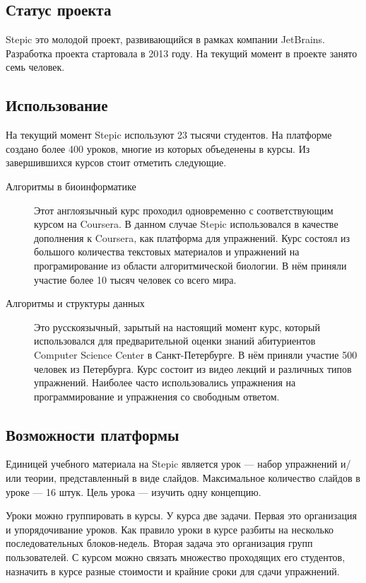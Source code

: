 \documentclass{matmex-diploma-custom}
\begin{document}
\subsection{Статус проекта}
Stepic \cite{stepic} это молодой проект, развивающийся в рамках компании
JetBrains. Разработка проекта стартовала в 2013 году. На текущий
момент в проекте занято семь человек.

\subsection{Использование}
На текущий момент Stepic используют 23 тысячи студентов. На платформе
создано более 400 уроков, многие из которых объеденены в курсы. Из
завершившихся курсов стоит отметить следующие.

\begin{description}
\item[Алгоритмы в биоинформатике] Этот англоязычный курс проходил
  одновременно с соответствующим курсом на Coursera. В данном случае
  Stepic использовался в качестве дополнения к Coursera, как платформа
  для упражнений. Курс состоял из большого количества текстовых
  материалов и упражнений на програмирование из области
  алгоритмической биологии. В нём приняли участие более 10 тысяч
  человек со всего мира.

\item[Алгоритмы и структуры данных] Это русскоязычный, зарытый на
  настоящий момент курс, который использовался для предварительной
  оценки знаний абитуриентов Computer Science Center в
  Санкт-Петербурге. В нём приняли участие 500 человек из
  Петербурга. Курс состоит из видео лекций и различных типов
  упражнений. Наиболее часто использовались упражнения на
  программирование и упражнения со свободным ответом.
\end{description}

\subsection{Возможности платформы}
Единицей учебного материала на Stepic является урок --- набор упражнений
и/или теории, представленный в виде слайдов. Максимальное количество
слайдов в уроке --- 16 штук. Цель урока --- изучить одну концепцию.

Уроки можно группировать в курсы. У курса две задачи. Первая это
организация и упорядочивание уроков. Как правило уроки в курсе разбиты
на несколько последовательных блоков-недель. Вторая задача это
организация групп пользователей. С курсом можно связать множество
проходящих его студентов, назначить в курсе разные стоимости и крайние
сроки для сдачи упражнений.
\end{document}
